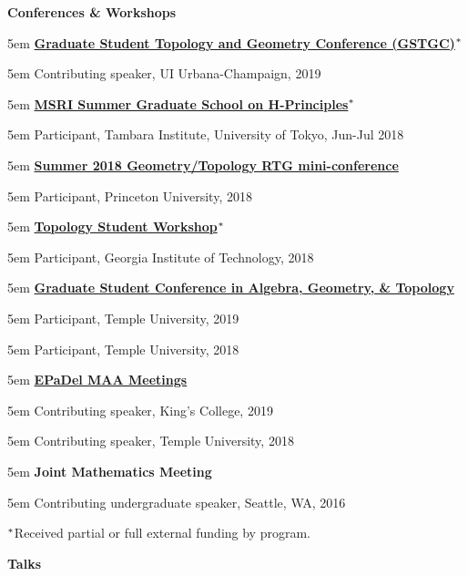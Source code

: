 \documentclass[10.5pt]{article}
\newcommand{\sectitle}[1]{{\large \textbf{#1}}\vspace{.5em}}
\newcommand{\itemreg}[1]{\begin{addmargin}[0em]{5em} #1 \end{addmargin}}
\newcommand{\itemregind}[1]{\begin{addmargin}[1em]{5em} #1 \end{addmargin}}
\begin{document}
\sectitle{Conferences \& Workshops}

\itemreg{\textbf{\href{https://faculty.math.illinois.edu/~hquan4/GSTGC2019/index.html}{Graduate Student Topology and Geometry Conference (GSTGC)}}$\null^*$}
	\itemregind{Contributing speaker, UI Urbana-Champaign, 2019}
	\vspace{.25em}

\itemreg{\textbf{\href{http://www.msri.org/web/msri/scientific/workshops/summer-graduate-school}{MSRI Summer Graduate School on H-Principles}}$\null^*$}
	\itemregind{Participant, Tambara Institute, University of Tokyo, Jun-Jul 2018}
	\vspace{.25em}
	
\itemreg{\textbf{\href{https://web.math.princeton.edu/~petero/RTG/MiniConf1.html}{Summer 2018 Geometry/Topology RTG mini-conference}}}
	\itemregind{Participant, Princeton University, 2018}
	\vspace{.25em}
	
\itemreg{\textbf{\href{http://people.math.gatech.edu/~dmargalit7/tsw18/index.shtml}{Topology Student Workshop}}$\null^*$}
	\itemregind{Participant, Georgia Institute of Technology, 2018}
	\vspace{.25em}
	
\itemreg{\textbf{\href{https://math.temple.edu/events/conferences/gscagt/}{Graduate Student Conference in Algebra, Geometry, \& Topology}}}
	\itemregind{Participant, Temple University, 2019}
	\itemregind{Participant, Temple University, 2018}
	\vspace{.25em}
		
\itemreg{\textbf{\href{http://sections.maa.org/epadel/}{EPaDel MAA Meetings}}}
	\itemregind{Contributing speaker, King's College, 2019}
	\itemregind{Contributing speaker, Temple University, 2018}
	\vspace{.25em}
		
\itemreg{\textbf{Joint Mathematics Meeting}}
	\itemregind{Contributing undergraduate speaker, Seattle, WA, 2016}
	\vspace{.25em}
	
	\hspace{-0em}$\null^*${\footnotesize{Received partial or full external funding by program.}}
\vspace{2em}



\sectitle{Talks}
\end{document}
